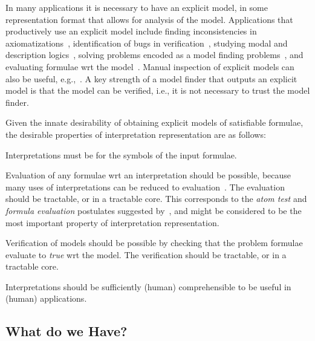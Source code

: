\documentclass{easychair}
\newenvironment{packed_enumerate}{
\vspace*{-0.3em}
\begin{enumerate}
\setlength{\partopsep}{0pt}
\setlength{\itemsep}{1pt}
\setlength{\parskip}{0pt}
\setlength{\parsep}{0pt}
}{\end{enumerate}}
\begin{document}
In many applications it is necessary to have an explicit model, in some representation format that
allows for analysis of the model.
Applications that productively use an explicit model include finding inconsistencies in 
axiomatizations~\cite{SS+17}, identification of bugs in verification~\cite{CE82,QS82},
studying modal and description logics~\cite{SH13}, solving problems encoded as a model finding 
problems~\cite{Win82}, and evaluating formulae wrt the model~\cite{SS+23-LPAR}.
Manual inspection of explicit models can also be useful, e.g.,~\cite{EK+10}.
A key strength of a model finder that outputs an explicit model is that the model can be verified,
i.e., it is not necessary to trust the model finder.

Given the innate desirability of obtaining explicit models of satisfiable formulae, the desirable
properties of interpretation representation are as follows:
\begin{packed_enumerate}
\item Interpretations must be for the symbols of the input formulae.
\item Evaluation of any formulae wrt an interpretation should be possible, because many uses of
      interpretations can be reduced to evaluation~\cite[\S3.2]{CLP04}.
      The evaluation should be tractable, or in a tractable core.
      This corresponds to the \emph{atom test} and \emph{formula evaluation} postulates suggested
      by~\cite{FL96,CLP04}, and might be considered to be the most important property of
      interpretation representation.
\item Verification of models should be possible by checking that the problem formulae evaluate 
      to \textit{true} wrt the model.
      The verification should be tractable, or in a tractable core.
\item Interpretations should be sufficiently (human) comprehensible to be useful in (human)
      applications.
\end{packed_enumerate}

\subsection{What do we Have?}
\label{Have}
\end{document}
